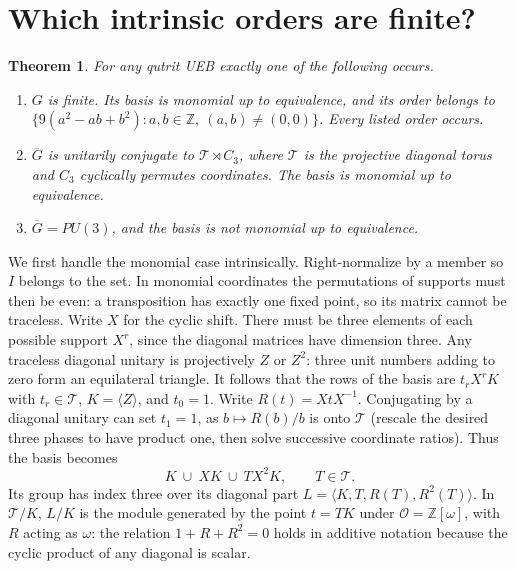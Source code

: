 \documentclass[10pt]{article}
\newtheorem{theorem}{Theorem}\newtheorem{lemma}[theorem]{Lemma}\newcommand{\C}{\mathbb C}
\newcommand{\T}{\mathcal T}\DeclareMathOperator{\Tr}{Tr}\DeclareMathOperator{\Ad}{Ad}
\begin{document}
\section{Which intrinsic orders are finite?}
\begin{theorem}\label{tri}For any qutrit UEB exactly one of the following occurs.
\begin{enumerate}\setlength{\itemsep}{0pt}
\item $G$ is finite. Its basis is monomial up to equivalence, and its order belongs to $\{9(a^2-ab+b^2):a,b\in\mathbb Z,\ (a,b)\ne(0,0)\}$. Every listed order occurs.
\item $\overline G$ is unitarily conjugate to $\T\rtimes C_3$, where $\T$ is the projective diagonal torus and $C_3$ cyclically permutes coordinates. The basis is monomial up to equivalence.
\item $\overline G=PU(3)$, and the basis is not monomial up to equivalence.
\end{enumerate}
\end{theorem}
We first handle the monomial case intrinsically. Right-normalize by a member so $I$ belongs to the set. In monomial coordinates the permutations of supports must then be even: a transposition has exactly one fixed point, so its matrix cannot be traceless. Write $X$ for the cyclic shift. There must be three elements of each possible support $X^r$, since the diagonal matrices have dimension three. Any traceless diagonal unitary is projectively $Z$ or $Z^2$: three unit numbers adding to zero form an equilateral triangle. It follows that the rows of the basis are $t_r X^r K$ with $t_r\in\T$, $K=\langle Z\rangle$, and $t_0=1$. Write $R(t)=XtX^{-1}$. Conjugating by a diagonal unitary can set $t_1=1$, as $b\mapsto R(b)/b$ is onto $\T$ (rescale the desired three phases to have product one, then solve successive coordinate ratios). Thus the basis becomes
\[
                          K\ \cup\ XK\ \cup\ T X^2 K,\qquad T\in\T .
\]
Its group has index three over its diagonal part $L=\langle K,T,R(T),R^2(T)\rangle$. In $\T/K$, $L/K$ is the module generated by the point $t=TK$ under $\mathcal O=\mathbb Z[\omega]$, with $R$ acting as $\omega$: the relation $1+R+R^2=0$ holds in additive notation because the cyclic product of any diagonal is scalar.
\end{document}
